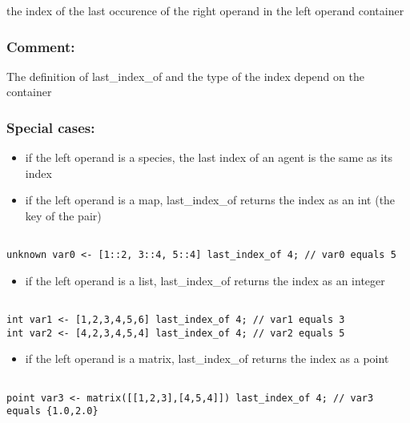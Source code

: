 \documentclass[]{book}
\providecommand{\tightlist}{%
  \setlength{\itemsep}{0pt}\setlength{\parskip}{0pt}}
\theoremstyle{definition}
\theoremstyle{definition}
\theoremstyle{definition}
\theoremstyle{remark}
\begin{document}
the index of the last occurence of the right operand in the left operand
container

\subsubsection{Comment:}\label{comment-57}

The definition of last\_index\_of and the type of the index depend on
the container

\subsubsection{Special cases:}\label{special-cases-85}

\begin{itemize}
\tightlist
\item
  if the left operand is a species, the last index of an agent is the
  same as its index\\
\item
  if the left operand is a map, last\_index\_of returns the index as an
  int (the key of the pair)
\end{itemize}

\begin{verbatim}
 
unknown var0 <- [1::2, 3::4, 5::4] last_index_of 4; // var0 equals 5
\end{verbatim}

\begin{itemize}
\tightlist
\item
  if the left operand is a list, last\_index\_of returns the index as an
  integer
\end{itemize}

\begin{verbatim}
 
int var1 <- [1,2,3,4,5,6] last_index_of 4; // var1 equals 3 
int var2 <- [4,2,3,4,5,4] last_index_of 4; // var2 equals 5
\end{verbatim}

\begin{itemize}
\tightlist
\item
  if the left operand is a matrix, last\_index\_of returns the index as
  a point
\end{itemize}

\begin{verbatim}
 
point var3 <- matrix([[1,2,3],[4,5,4]]) last_index_of 4; // var3 equals {1.0,2.0}
\end{verbatim}
\end{document}
